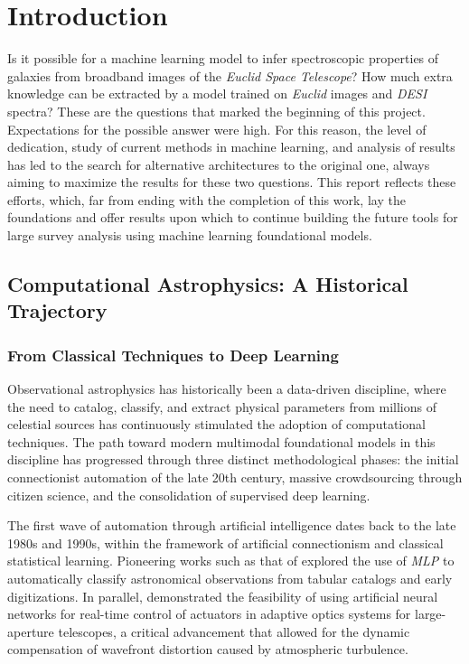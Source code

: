 
\section{Introduction}

Is it possible for a machine learning model to infer spectroscopic properties of galaxies from broadband images of the \textit{Euclid Space Telescope}? How much extra knowledge can be extracted by a model trained on \textit{Euclid} images and \textit{DESI} spectra? These are the questions that marked the beginning of this project. Expectations for the possible answer were high. For this reason, the level of dedication, study of current methods in machine learning, and analysis of results has led to the search for alternative architectures to the original one, always aiming to maximize the results for these two questions. This report reflects these efforts, which, far from ending with the completion of this work, lay the foundations and offer results upon which to continue building the future tools for large survey analysis using machine learning foundational models.


\subsection{Computational Astrophysics: A Historical Trajectory}

\subsubsection{From Classical Techniques to Deep Learning}

Observational astrophysics has historically been a data-driven discipline, where the need to catalog, classify, and extract physical parameters from millions of celestial sources has continuously stimulated the adoption of computational techniques. The path toward modern multimodal foundational models in this discipline has progressed through three distinct methodological phases: the initial connectionist automation of the late 20th century, massive crowdsourcing through citizen science, and the consolidation of supervised deep learning.

The first wave of automation through artificial intelligence dates back to the late 1980s and 1990s, within the framework of artificial connectionism and classical statistical learning. Pioneering works such as that of \textcite{ar:adorf-1988} explored the use of \textit{\gls{MLP}} to automatically classify astronomical observations from tabular catalogs and early digitizations. In parallel, \textcite{ar:angel-1990} demonstrated the feasibility of using artificial neural networks for real-time control of actuators in adaptive optics systems for large-aperture telescopes, a critical advancement that allowed for the dynamic compensation of wavefront distortion caused by atmospheric turbulence.

